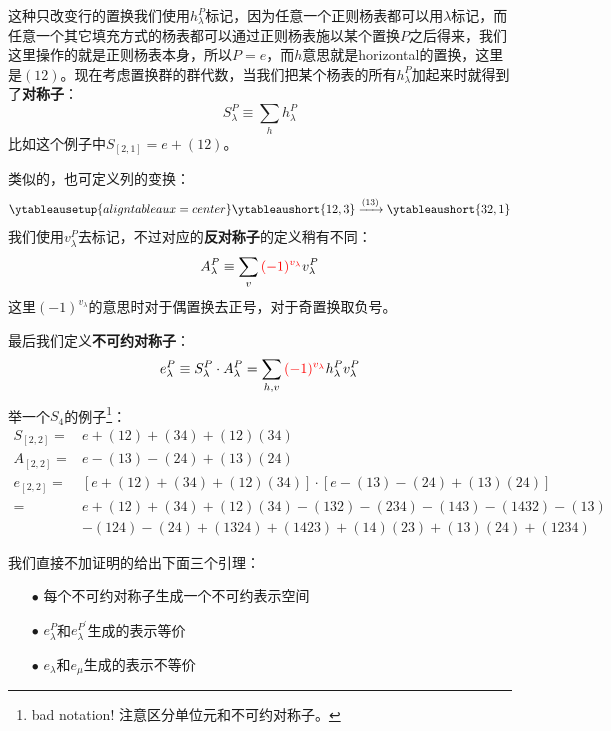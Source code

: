 这种只改变行的置换我们使用$h^P_\lambda$标记，因为任意一个正则杨表都可以用$\lambda$标记，而任意一个其它填充方式的杨表都可以通过正则杨表施以某个置换$P$之后得来，我们这里操作的就是正则杨表本身，所以$P=e$，而$h$意思就是horizontal的置换，这里是$(12)$。现在考虑置换群的群代数，当我们把某个杨表的所有$h^P_\lambda$加起来时就得到了\textbf{对称子}：
\begin{equation}
	S_\lambda^P\equiv\sum_h h^P_\lambda
\end{equation}
比如这个例子中$S_{[2,1]}=e+(12)$。

类似的，也可定义列的变换：
\begin{equation*}
	\ytableausetup{aligntableaux=center}
	\ytableaushort{12,3}\xrightarrow{{(13)}}	\ytableaushort{32,1}
\end{equation*}
我们使用$v^{P}_\lambda$去标记，不过对应的\textbf{反对称子}的定义稍有不同：
\begin{equation}
	A_\lambda^P\equiv\sum_v {\color{red}(-1)^{v_\lambda}}v^P_\lambda
\end{equation}
这里$(-1)^{v_\lambda}$的意思时对于偶置换去正号，对于奇置换取负号。

最后我们定义\textbf{不可约对称子}：
\begin{equation}
	e_\lambda^P\equiv S_\lambda^P\cdot A_\lambda^P=\sum_{h,v} {\color{red}(-1)^{v_\lambda}}h^P_\lambda v_\lambda^P
\end{equation}
举一个$S_4$的例子\footnote{bad notation! 注意区分单位元和不可约对称子。}：
\begin{equation}
	\begin{aligned}
		S_{[2,2]}=&e+(12)+(34)+(12)(34)\\
		A_{[2,2]}=&e-(13)-(24)+(13)(24)\\
		e_{[2,2]}=&\left[e+(12)+(34)+(12)(34)\right]\cdot \left[e-(13)-(24)+(13)(24)\right]\\
		=&
		e+(12)+(34)+(12)(34)-(132)-(234)-(143)-(1432)-(13)\\&-(124)-(24)+(1324)+(1423)+(14)(23)+(13)(24)+(1234)
	\end{aligned}
\end{equation}

我们直接不加证明的给出下面三个引理：
\begin{itemize}
	\item [$\bullet$] 每个不可约对称子生成一个不可约表示空间
	\item [$\bullet$] $e^P_\lambda$和$e^{P^\prime}_\lambda$生成的表示等价
	\item [$\bullet$]  $e_\lambda$和$e_\mu$生成的表示不等价
\end{itemize}

